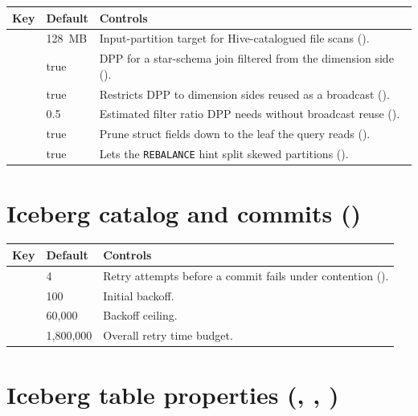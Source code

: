 \begin{longtable}{@{}P{6.6cm}P{2.3cm}P{5.7cm}@{}}
\toprule
\textbf{Key} & \textbf{Default} & \textbf{Controls} \\
\midrule
\endhead
{} & 128~MB & Input-partition target
  for Hive-catalogued file scans (). \\
 & true & DPP for a
  star-schema join filtered from the dimension side
  (). \\
 & true &
  Restricts DPP to dimension sides reused as a broadcast
  (). \\
 & 0.5 &
  Estimated filter ratio DPP needs without broadcast reuse
  (). \\
 & true & Prune struct
  fields down to the leaf the query reads (). \\
 & true &
  Lets the \texttt{REBALANCE} hint split skewed partitions
  (). \\
\bottomrule
\end{longtable}

\section{Iceberg catalog and commits ()}

\begin{longtable}{@{}P{6.6cm}P{2.3cm}P{5.7cm}@{}}
\toprule
\textbf{Key} & \textbf{Default} & \textbf{Controls} \\
\midrule
\endhead
{} & 4 & Retry attempts before a commit fails
  under contention (). \\
 & 100 & Initial backoff. \\
 & 60{,}000 & Backoff ceiling. \\
 & 1{,}800{,}000 & Overall retry time
  budget. \\
\bottomrule
\end{longtable}

\section{Iceberg table properties (, , )}

